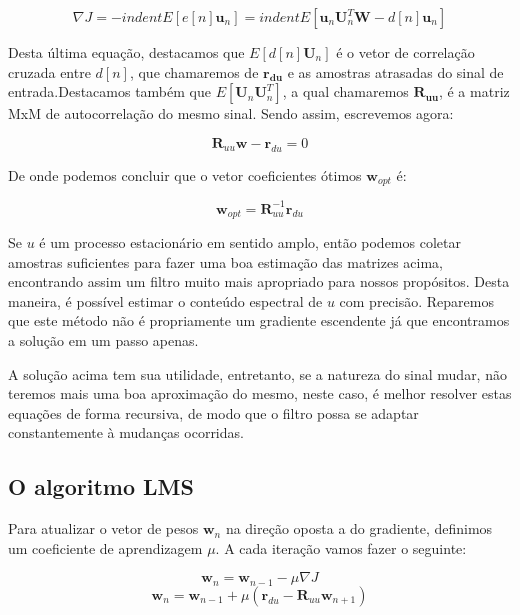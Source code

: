 \documentclass[a4paper, 12pt]{book}
\begin{document}
\begin{equation}
    \nabla J=-indent E[e[n]\boldsymbol{u}_n]=indentE[\boldsymbol{u}_n\boldsymbol{U}^{T}_n\boldsymbol{W}-d[n]\boldsymbol{u}_n]   
\end{equation}

Desta última equação, destacamos que $E[d[n]\boldsymbol{U}_n]$ é o vetor de correlação cruzada entre $d[n]$, que chamaremos de $\boldsymbol{r_{du}}$ e as amostras atrasadas do sinal de entrada.Destacamos também que $E[\boldsymbol{U}_n\boldsymbol{U}^{T}_n]$, a qual chamaremos $\boldsymbol{R_{uu}}$, é a matriz MxM de autocorrelação do mesmo sinal. Sendo assim, escrevemos agora:

\begin{equation}
    \boldsymbol{R}_{uu}\boldsymbol{w}-\boldsymbol{r}_{du}=0
\end{equation}

De onde podemos concluir que o vetor coeficientes ótimos $\boldsymbol{w}_{opt}$ é:

\begin{equation}
    \boldsymbol{w}_{opt}=\boldsymbol{R}_{uu}^{-1}\boldsymbol{r}_{du}
\end{equation}

Se $u$ é um processo estacionário em sentido amplo, então podemos coletar amostras suficientes para fazer uma boa estimação das matrizes acima, encontrando assim um filtro muito mais apropriado para nossos propósitos. Desta maneira, é possível estimar o conteúdo espectral de $u$ com precisão. Reparemos que este método não é propriamente um gradiente escendente já que encontramos a solução em um passo apenas.

\indent A solução acima tem sua utilidade, entretanto, se a natureza do sinal mudar, não teremos mais uma boa aproximação do mesmo, neste caso, é melhor resolver estas equações de forma recursiva, de modo que o filtro possa se adaptar constantemente à mudanças ocorridas.  

\subsection{O algoritmo LMS}

Para atualizar o vetor de pesos $\boldsymbol{w}_n$ na direção oposta a do gradiente, definimos um coeficiente de aprendizagem $\mu$. A cada iteração vamos fazer o seguinte:

\begin{equation*}
    \boldsymbol{w}_{n}=\boldsymbol{w}_{n-1} - \mu \nabla J
\end{equation*}
\begin{equation}
    \boldsymbol{w}_{n}=\boldsymbol{w}_{n-1} + \mu(\boldsymbol{r}_{du}-\boldsymbol{R}_{uu} \boldsymbol{w}_{n+1})
\end{equation}
\end{document}
